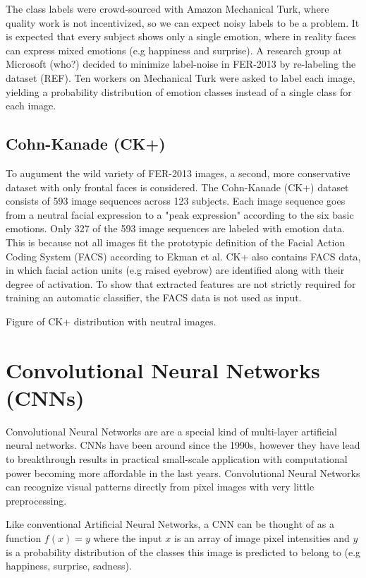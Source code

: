 \documentclass[twoside]{article}
\begin{document}
\begin{multicols}{2}
The class labels were crowd-sourced with Amazon Mechanical Turk, where quality work is not incentivized, so we can expect noisy labels to be a problem. It is expected that every subject shows only a single emotion, where in reality faces can express mixed emotions (e.g happiness and surprise). A research group at Microsoft (who?) decided to minimize label-noise in FER-2013 by re-labeling the dataset (REF). Ten workers on Mechanical Turk were asked to label each image, yielding a probability distribution of emotion classes instead of a single class for each image.


\subsection{Cohn-Kanade (CK+)}
To augument the wild variety of FER-2013 images, a second, more conservative dataset with only frontal faces is considered. The Cohn-Kanade (CK+) dataset consists of 593 image sequences across 123 subjects. Each image sequence goes from a neutral facial expression to a "peak expression" according to the six basic emotions. Only 327 of the 593 image sequences are labeled with emotion data. This is because not all images fit the prototypic definition of the Facial Action Coding System (FACS) according to Ekman et al. CK+ also contains FACS data, in which facial action units (e.g raised eyebrow) are identified along with their degree of activation. To show that extracted features are not strictly required for training an automatic classifier, the FACS data is not used as input.

Figure of CK+ distribution with neutral images.


\section{Convolutional Neural Networks (CNNs)}
Convolutional Neural Networks are are a special kind of multi-layer artificial neural networks. CNNs have been around since the 1990s, however they have lead to breakthrough results in practical small-scale application with computational power becoming more affordable in the last years. Convolutional Neural Networks can recognize visual patterns directly from pixel images with very little preprocessing. 

Like conventional Artificial Neural Networks, a CNN can be thought of as a function $f(x) = y$ where the input $x$ is an array of image pixel intensities and $y$ is a probability distribution of the classes this image is predicted to belong to (e.g happiness, surprise, sadness).


\end{multicols}
\end{document}
